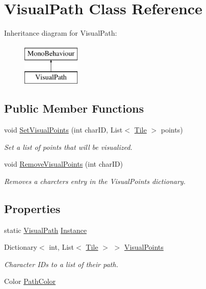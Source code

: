 \hypertarget{class_visual_path}{}\section{Visual\+Path Class Reference}
\label{class_visual_path}
Inheritance diagram for Visual\+Path\+:\begin{figure}[H]
\begin{center}
\leavevmode
\includegraphics[height=2.000000cm]{class_visual_path}
\end{center}
\end{figure}
\subsection*{Public Member Functions}
\begin{DoxyCompactItemize}
\item 
void \hyperlink{class_visual_path_a3f55917f6f07be3a6b431ff81436ef90}{Set\+Visual\+Points} (int char\+ID, List$<$ \hyperlink{class_tile}{Tile} $>$ points)
\begin{DoxyCompactList}\small\item\em Set a list of points that will be visualized. \end{DoxyCompactList}\item 
void \hyperlink{class_visual_path_af955b5b00118a0c87d4e103d3d14e728}{Remove\+Visual\+Points} (int char\+ID)
\begin{DoxyCompactList}\small\item\em Removes a charcters entry in the Visual\+Points dictionary. \end{DoxyCompactList}\end{DoxyCompactItemize}
\subsection*{Properties}
\begin{DoxyCompactItemize}
\item 
static \hyperlink{class_visual_path}{Visual\+Path} \hyperlink{class_visual_path_a3809d8ab9f435b730e73c75b8776d755}{Instance}
\item 
Dictionary$<$ int, List$<$ \hyperlink{class_tile}{Tile} $>$ $>$ \hyperlink{class_visual_path_aeb1724daee797ed6d4226dd211b5b745}{Visual\+Points}
\begin{DoxyCompactList}\small\item\em Character I\+Ds to a list of their path. \end{DoxyCompactList}\item 
Color \hyperlink{class_visual_path_a6a67dc78c28f2231d649210575b1e628}{Path\+Color}
\end{DoxyCompactItemize}


